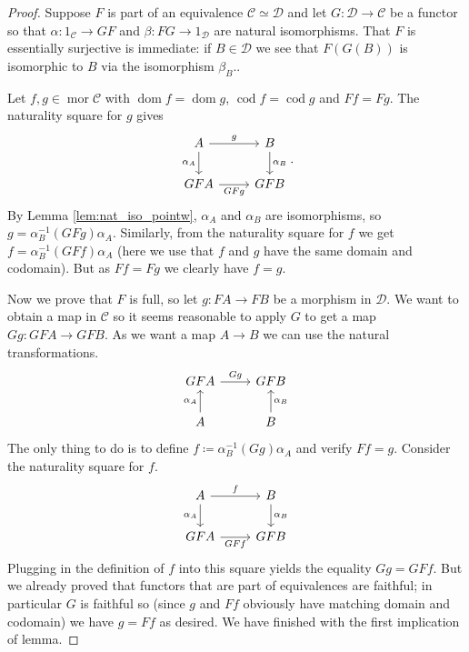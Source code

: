 \documentclass{report}
\DeclareMathOperator{\mor}{mor}
\DeclareMathOperator{\dom}{dom}
\DeclareMathOperator{\cod}{cod}
\theoremstyle{definition}
\theoremstyle{plain}
\theoremstyle{definition}
\begin{document}
	\begin{proof}
		Suppose $F$ is part of an equivalence $\mathcal{C}\simeq \mathcal{D}$ and let $G\colon \mathcal{D}\to\mathcal{C}$ be a functor so that $\alpha\colon 1_{\mathcal{C}}\to GF$ and $\beta \colon FG \to 1_{\mathcal{D}}$ are natural isomorphisms. That $F$ is essentially surjective is immediate: if $B\in\mathcal{D}$ we see that $F(G(B))$ is isomorphic to $B$ via the isomorphism $\beta_B$..
		
		Let $f,g\in\mor \mathcal{C}$ with $\dom f = \dom g$, $\cod f = \cod g$ and $Ff = Fg$. The naturality square for $g$ gives
		\[\begin{tikzcd}
			A & { B} \\
			GFA & GFB
			\arrow["g", from=1-1, to=1-2]
			\arrow["{\alpha_A}"', from=1-1, to=2-1]
			\arrow["{\alpha_B}", from=1-2, to=2-2]
			\arrow["GFg"', from=2-1, to=2-2]
		\end{tikzcd}.\]
		By Lemma \ref{lem:nat_iso_pointw}, $\alpha_A$ and $\alpha_B$ are isomorphisms, so $g = \alpha_B^{-1}(GFg) \alpha_A$. Similarly, from the naturality square for $f$ we get $f = \alpha_B^{-1}(GFf) \alpha_A$ (here we use that $f$ and $g$ have the same domain and codomain). But as $Ff = Fg$ we clearly have $f = g$. 
		
		Now we prove that $F$ is full, so let $g\colon FA \to FB$ be a morphism in $\mathcal{D}$. We want to obtain a map in $\mathcal{C}$ so it seems reasonable to apply $G$ to get a map $Gg\colon GFA\to GFB$. As we want a map $A\to B$ we can use the natural transformations.
		\[\begin{tikzcd}
			GFA & GFB \\
			A & B
			\arrow["Gg", from=1-1, to=1-2]
			\arrow["{\alpha_A}", from=2-1, to=1-1]
			\arrow["{\alpha_B}"', from=2-2, to=1-2]
		\end{tikzcd}\]
		The only thing to do is to define $f\coloneqq \alpha^{-1}_B (Gg)\alpha_A$ and verify $Ff = g$. Consider the naturality square for $f$.
		\[\begin{tikzcd}
			A & B \\
			GFA & GFB
			\arrow["f", from=1-1, to=1-2]
			\arrow["GFf"', from=2-1, to=2-2]
			\arrow["{\alpha_A}"', from=1-1, to=2-1]
			\arrow["{\alpha_B}", from=1-2, to=2-2]
		\end{tikzcd}\]
		Plugging in the definition of $f$ into this square yields the equality $Gg = GFf$. But we already proved that functors that are part of equivalences are faithful; in particular $G$ is faithful so (since $g$ and $Ff$ obviously have matching domain and codomain) we have $g = Ff$ as desired. We have finished with the first implication of lemma.
		

\end{proof}
\end{document}
